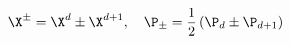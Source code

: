 \begin{equation}
\X^{\pm }=\X^{d}\pm \X^{d+1},\quad
\P_{\pm } =\frac{1}{2}\left( \P_{d}\pm
\P_{d+1}\right)
\end{equation}

